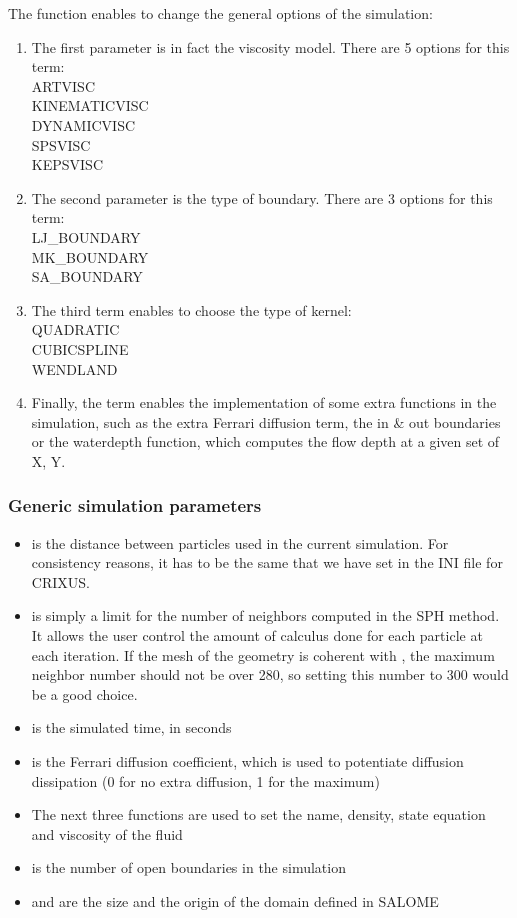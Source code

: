 \documentclass[12pt]{memoir}
\begin{document}
The  function enables to change the
 general options of the simulation:
\begin{enumerate}
\item The first parameter is in fact the viscosity model. There are 5 options for this term: \\
ARTVISC\\
KINEMATICVISC\\
DYNAMICVISC\\
SPSVISC\\
KEPSVISC\\
\item The second parameter is the type of boundary. There are 3 options for this term:\\
LJ\_BOUNDARY\\
MK\_BOUNDARY\\
SA\_BOUNDARY\\
\item The third term enables to choose the type of kernel:\\
QUADRATIC\\
CUBICSPLINE\\
WENDLAND\\
\item Finally, the  term enables the implementation 
of some extra functions in the simulation, such as the extra Ferrari diffusion term, 
the in \& out boundaries or the waterdepth function, 
which computes the flow depth at a given set of X, Y.
\end{enumerate}

\subsubsection{Generic simulation parameters}
\begin{itemize}
\item {} is the distance between particles used in the current simulation. 
For consistency reasons, it has to be the same that we have set in the INI file for CRIXUS.
\item {} is simply a limit for the number of neighbors computed 
in the SPH method. It allows the user control the amount of calculus 
done for each particle at each iteration. If the mesh of the geometry 
is coherent with , the maximum neighbor number should not be over 280, 
so setting this number to 300 would be a good choice.
\item {} is the simulated time, in seconds
\item {} is the Ferrari diffusion coefficient, which is used 
to potentiate diffusion dissipation (0 for no extra diffusion, 1 for the maximum)
\item The next three functions are used to set the name, density, state equation and viscosity of the fluid
\item {} is the number of open boundaries in the simulation
\item {} and  are the size and the origin of the domain defined in SALOME
\end{itemize}
\end{document}
